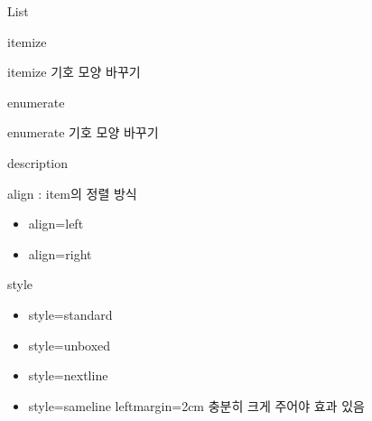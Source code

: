 \documentclass[ aspectratio=149,  10pt,blue,xcolor=pdftex,dvipsnames,table,handout,notes]{beamer}
\begin{document}


		\begin{frame}[t]{List}

		\note[item]{}
		\end{frame}


		\begin{frame}[t]{itemize}

		\end{frame}


		\begin{frame}[t]{itemize 기호 모양 바꾸기}

		\end{frame}


		\begin{frame}[t]{enumerate}

		\end{frame}

		\begin{frame}[t]{enumerate 기호 모양 바꾸기}

		\end{frame}


		\begin{frame}[t]{description}

			\begin{block}{align : item의 정렬 방식}
			\begin{itemize}
			\item align=left
			\item align=right
			\end{itemize}
			\end{block}

			\begin{block}{style}
			\begin{itemize}
			\item style=standard
			\item style=unboxed
			\item style=nextline
			\item style=sameline  leftmargin=2cm 충분히 크게 주어야 효과 있음
			\end{itemize}
			\end{block}



		\end{frame}
\end{document}
